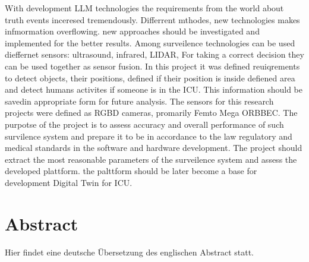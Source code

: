 \documentclass[12pt]{report}           %
\theoremstyle{thesis}        %
\begin{document}
With development LLM technologies the requirements from the world about truth events inceresed tremendously. Differrent mthodes, new technologies makes infmormation overflowing. new approaches should be investigated and implemented  for the better results. 
Among surveilence technologies can be used dieffernet sensors: ultrasound, infrared, LIDAR, For taking a correct decision they can be used together as sensor fusion. In this project it was defined reuiqrements to detect objects, their positions, defined if their position is inside defiened area and detect humans activites if someone is in the ICU. This information should be savedin appropriate form for future analysis.
The sensors for this research projects were defined as RGBD cameras, promarily Femto Mega ORBBEC. The purpotse of the project is to assess accuracy and overall performance of such survilence system and prepare it to be in accordance to the law regulatory and medical standards in the software and hardware development. The project should extract the most reasonable parameters of the surveilence system and assess the developed plattform. the palttform should be later become a base for development Digital Twin for ICU.
	\newpage
	\section*{Abstract}
Hier findet eine deutsche Übersetzung des englischen \glqq Abstract\grqq{} statt. 
	\newpage
	
	
	
\end{document}
